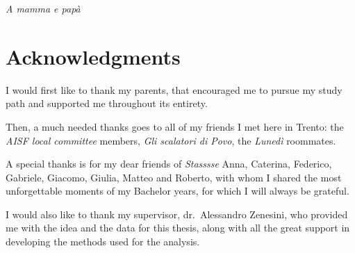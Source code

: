 

\LogoWidth{4.5cm} %

\begin{titlepage}
    \pagestyle{empty}
    \makefrontpage
    \restoregeometry
\end{titlepage}

\thispagestyle{empty} %

\frontmatter
\null{}
\begin{flushright}
    \textit{A mamma e papà}
\end{flushright}
\null

\chapter*{Acknowledgments}
I would first like to thank my parents, that encouraged me to pursue my study path and supported me throughout its entirety. 

Then, a much needed thanks goes to all of my friends I met here in Trento: the \textit{AISF local committee} members, \textit{Gli scalatori di Povo}, the \textit{Lunedì} roommates. 

A special thanks is for my dear friends of \textit{Stasssse} Anna, Caterina, Federico, Gabriele, Giacomo, Giulia, Matteo and Roberto, with whom I shared the most unforgettable moments of my Bachelor years, for which I will always be grateful.

I would also like to thank my supervisor, dr.\ Alessandro Zenesini, who provided me with the idea and the data for this thesis, along with all the great support in developing the methods used for the analysis. 

